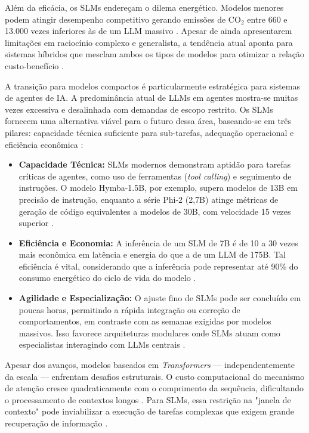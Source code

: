 \documentclass[
	12pt,				%
	openright,			%
	oneside,			%
	a4paper,			%
	dissertacao,			%
	]{ABNT-DC-UEL}
\begin{document}
Além da eficácia, os SLMs endereçam o dilema energético. Modelos menores podem atingir desempenho competitivo gerando emissões de CO$_2$ entre 660 e 13.000 vezes inferiores às de um LLM massivo \cite{garg2025}. Apesar de ainda apresentarem limitações em raciocínio complexo e generalista, a tendência atual aponta para sistemas híbridos que mesclam ambos os tipos de modelos para otimizar a relação custo-benefício \cite{zhao2025}.

A transição para modelos compactos é particularmente estratégica para sistemas de agentes de IA. A predominância atual de LLMs em agentes mostra-se muitas vezes excessiva e desalinhada com demandas de escopo restrito. Os SLMs fornecem uma alternativa viável para o futuro dessa área, baseando-se em três pilares: capacidade técnica suficiente para sub-tarefas, adequação operacional e eficiência econômica \cite{wang2025llmsurvey, belcak2025}:

\begin{itemize}
  \item \textbf{Capacidade Técnica:} SLMs modernos demonstram aptidão para tarefas críticas de agentes, como uso de ferramentas (\textit{tool calling}) e seguimento de instruções. O modelo Hymba-1.5B, por exemplo, supera modelos de 13B em precisão de instrução, enquanto a série Phi-2 (2,7B) atinge métricas de geração de código equivalentes a modelos de 30B, com velocidade 15 vezes superior \cite{belcak2025}.
  \item \textbf{Eficiência e Economia:} A inferência de um SLM de 7B é de 10 a 30 vezes mais econômica em latência e energia do que a de um LLM de 175B. Tal eficiência é vital, considerando que a inferência pode representar até 90\% do consumo energético do ciclo de vida do modelo \cite{belcak2025}.
  \item \textbf{Agilidade e Especialização:} O ajuste fino de SLMs pode ser concluído em poucas horas, permitindo a rápida integração ou correção de comportamentos, em contraste com as semanas exigidas por modelos massivos. Isso favorece arquiteturas modulares onde SLMs atuam como especialistas interagindo com LLMs centrais \cite{belcak2025}.
\end{itemize}

Apesar dos avanços, modelos baseados em \textit{Transformers} — independentemente da escala — enfrentam desafios estruturais. O custo computacional do mecanismo de atenção cresce quadraticamente com o comprimento da sequência, dificultando o processamento de contextos longos \cite{jurafsky2025}. Para SLMs, essa restrição na "janela de contexto" pode inviabilizar a execução de tarefas complexas que exigem grande recuperação de informação \cite{wang2025llmsurvey}.
\end{document}
